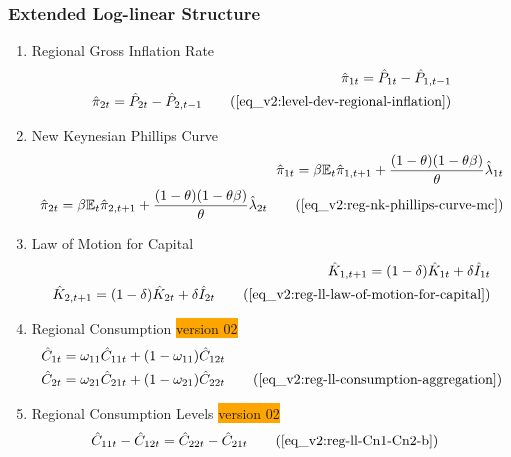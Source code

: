 \documentclass[../thesis.tex]{subfiles}
\begin{document}
{\singlespacing
	
	\subsubsection{Extended Log-linear Structure}
	
	\begin{enumerate}
		
		\item Regional Gross Inflation Rate
		\begin{align}
			\hat{\pi}_{1 t} = \hat{P}_{1 t} - \hat{P}_{1, t-1} \nonumber \\
			\hat{\pi}_{2 t} = \hat{P}_{2 t} - \hat{P}_{2, t-1} \tag{\ref{eq_v2:level-dev-regional-inflation}}
		\end{align}
		
		\item New Keynesian Phillips Curve
		\begin{align}
			\hat{\pi}_{1 t} = \beta \E \hat{\pi}_{1, t+1} + \frac{(1-\theta) (1- \theta \beta)}{\theta} \hat{\lambda}_{1 t} \nonumber \\
			\hat{\pi}_{2 t} = \beta \E \hat{\pi}_{2, t+1} + \frac{(1-\theta) (1- \theta \beta)}{\theta} \hat{\lambda}_{2 t} \tag{\ref{eq_v2:reg-nk-phillips-curve-mc}}
		\end{align}
		
		\item Law of Motion for Capital
		\begin{alignat}{2}
			\hat{K}_{1, t+1} = (1-\delta) \hat{K}_{1 t} + \delta \hat{I}_{1 t} \nonumber \\
			\hat{K}_{2, t+1} = (1-\delta) \hat{K}_{2 t} + \delta \hat{I}_{2 t} \tag{\ref{eq_v2:reg-ll-law-of-motion-for-capital}} 
		\end{alignat}


		\item Regional Consumption \colorbox{orange}{version 02}
		\begin{align}
			\hat{C}_{1t} &= \omega_{11} \hat{C}_{11t} + (1-\omega_{11}) \hat{C}_{12t} \nonumber \\ 
			\hat{C}_{2t} &= \omega_{21} \hat{C}_{21t} + (1-\omega_{21}) \hat{C}_{22t} \tag{\ref{eq_v2:reg-ll-consumption-aggregation}}
		\end{align}
		
		\item Regional Consumption Levels \colorbox{orange}{version 02}
		\begin{align}
			\hat{C}_{11t} - \hat{C}_{12t} &= \hat{C}_{22t} - \hat{C}_{21t} \tag{\ref{eq_v2:reg-ll-Cn1-Cn2-b}}
		\end{align}


\end{enumerate}}
\end{document}

